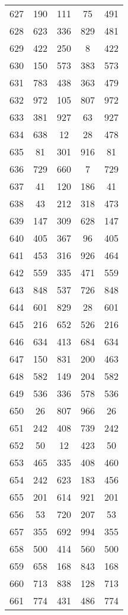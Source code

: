 \documentclass[a4paper,10pt,ngerman]{scrartcl}
\begin{document}
\begin{longtable}[c]{c|c|c|c|c}
    627 & 190 & 111 & 75 & 491 \\
    628 & 623 & 336 & 829 & 481 \\
    629 & 422 & 250 & 8 & 422 \\
    630 & 150 & 573 & 383 & 573 \\
    631 & 783 & 438 & 363 & 479 \\
    632 & 972 & 105 & 807 & 972 \\
    633 & 381 & 927 & 63 & 927 \\
    634 & 638 & 12 & 28 & 478 \\
    635 & 81 & 301 & 916 & 81 \\
    636 & 729 & 660 & 7 & 729 \\
    637 & 41 & 120 & 186 & 41 \\
    638 & 43 & 212 & 318 & 473 \\
    639 & 147 & 309 & 628 & 147 \\
    640 & 405 & 367 & 96 & 405 \\
    641 & 453 & 316 & 926 & 464 \\
    642 & 559 & 335 & 471 & 559 \\
    643 & 848 & 537 & 726 & 848 \\
    644 & 601 & 829 & 28 & 601 \\
    645 & 216 & 652 & 526 & 216 \\
    646 & 634 & 413 & 684 & 634 \\
    647 & 150 & 831 & 200 & 463 \\
    648 & 582 & 149 & 204 & 582 \\
    649 & 536 & 336 & 578 & 536 \\
    650 & 26 & 807 & 966 & 26 \\
    651 & 242 & 408 & 739 & 242 \\
    652 & 50 & 12 & 423 & 50 \\
    653 & 465 & 335 & 408 & 460 \\
    654 & 242 & 623 & 183 & 456 \\
    655 & 201 & 614 & 921 & 201 \\
    656 & 53 & 720 & 207 & 53 \\
    657 & 355 & 692 & 994 & 355 \\
    658 & 500 & 414 & 560 & 500 \\
    659 & 658 & 168 & 843 & 168 \\
    660 & 713 & 838 & 128 & 713 \\
    661 & 774 & 431 & 486 & 774 \\

\end{longtable}
\end{document}
